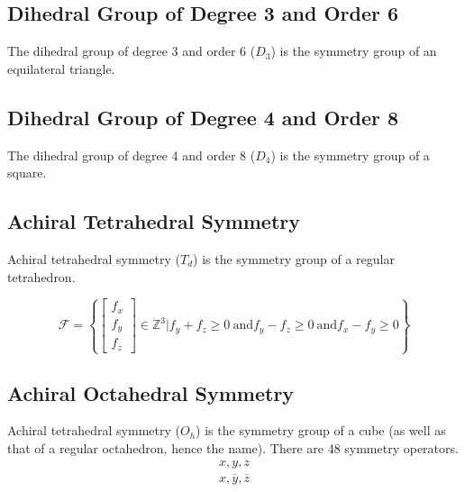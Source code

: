 \documentclass[acmtog]{acmart}
\begin{document}
\subsection{Dihedral Group of Degree 3 and Order 6}
The dihedral group of degree 3 and order 6 ($D_3$) is the symmetry group of an equilateral triangle.

\subsection{Dihedral Group of Degree 4 and Order 8}
The dihedral group of degree 4 and order 8 ($D_4$) is the symmetry group of a square.

\subsection{Achiral Tetrahedral Symmetry}
Achiral tetrahedral symmetry ($T_d$) is the symmetry group of a regular tetrahedron.

\begin{equation}
  \mathcal{F} = \left\{ \begin{bmatrix} f_x \\ f_y \\ f_z \end{bmatrix} \in \mathbb{Z}^3 | f_y + f_z \geq 0 \: \text{and} f_y - f_z \geq 0 \: \text{and} f_x - f_y \geq 0 \right\}
\end{equation}

\subsection{Achiral Octahedral Symmetry}
Achiral tetrahedral symmetry ($O_h$) is the symmetry group of a cube (as well as that of a regular octahedron, hence the name). There are 48 symmetry operators.
\begin{equation}
  \begin{split}
    x, y, z \\
    x, \overline{y}, \overline{z} \\
  \end{split}
\end{equation}
\end{document}
